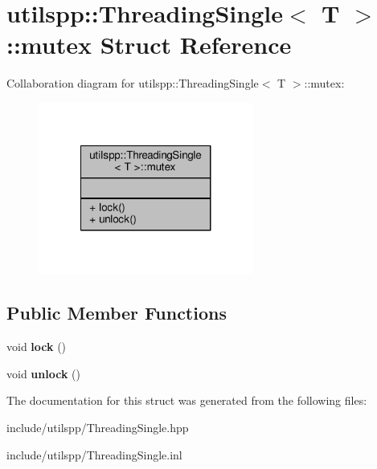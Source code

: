 \hypertarget{structutilspp_1_1ThreadingSingle_1_1mutex}{\section{utilspp\-:\-:Threading\-Single$<$ T $>$\-:\-:mutex Struct Reference}
\label{structutilspp_1_1ThreadingSingle_1_1mutex}
}


Collaboration diagram for utilspp\-:\-:Threading\-Single$<$ T $>$\-:\-:mutex\-:\nopagebreak
\begin{figure}[H]
\begin{center}
\leavevmode
\includegraphics[width=200pt]{structutilspp_1_1ThreadingSingle_1_1mutex__coll__graph}
\end{center}
\end{figure}
\subsection*{Public Member Functions}
\begin{DoxyCompactItemize}
\item 
\hypertarget{structutilspp_1_1ThreadingSingle_1_1mutex_a2eccbfd8e90e03d967649c3223510dbe}{void {\bfseries lock} ()}\label{structutilspp_1_1ThreadingSingle_1_1mutex_a2eccbfd8e90e03d967649c3223510dbe}

\item 
\hypertarget{structutilspp_1_1ThreadingSingle_1_1mutex_a4db91d8763bae7bb3a3dacb0ec56ea1f}{void {\bfseries unlock} ()}\label{structutilspp_1_1ThreadingSingle_1_1mutex_a4db91d8763bae7bb3a3dacb0ec56ea1f}

\end{DoxyCompactItemize}


The documentation for this struct was generated from the following files\-:\begin{DoxyCompactItemize}
\item 
include/utilspp/Threading\-Single.\-hpp\item 
include/utilspp/Threading\-Single.\-inl\end{DoxyCompactItemize}
